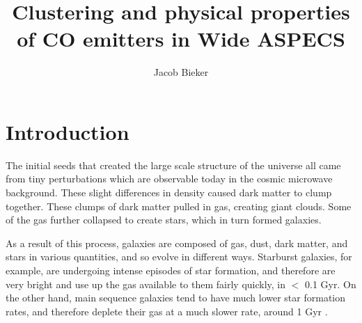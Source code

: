 \documentclass[twoside,single]{lion-msc}
\title{Clustering and physical properties of CO emitters in Wide ASPECS}
\author{Jacob Bieker}
\affiliation{Leiden Observatory, Leiden University}
\begin{document}
\maketitle

\setcounter{page}{2}
\tableofcontents
\cleardoublepage

\setcounter{page}{1}
\chapter{Introduction}






The initial seeds that created the large scale structure of the universe all came from tiny perturbations which are observable today in the cosmic microwave background. These slight differences in density caused dark matter to clump together. These clumps of dark matter pulled in gas, creating giant clouds. Some of the gas further collapsed to create stars, which in turn formed galaxies.

As a result of this process, galaxies are composed of gas, dust, dark matter, and stars in various quantities, and so evolve in different ways. Starburst galaxies, for example, are undergoing intense episodes of star formation, and therefore are very bright and use up the gas available to them fairly quickly, in $<$ 0.1 Gyr. On the other hand, main sequence galaxies tend to have much lower star formation rates, and therefore deplete their gas at a much slower rate, around 1 Gyr \cite{scoville2017evolution, silverman2015higher}.
\end{document}
